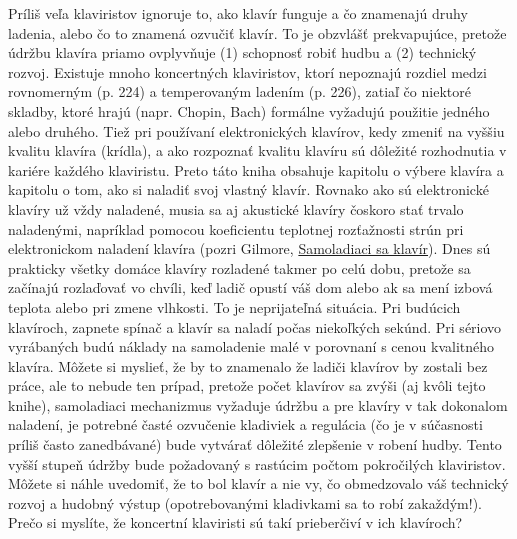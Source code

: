 Príliš veľa klaviristov ignoruje to, ako klavír funguje a čo znamenajú druhy ladenia, alebo čo to znamená ozvučiť klavír. To je obzvlášť prekvapujúce, pretože údržbu klavíra priamo ovplyvňuje (1) schopnosť robiť hudbu a (2) technický rozvoj. Existuje mnoho koncertných klaviristov, ktorí nepoznajú rozdiel medzi rovnomerným (p. 224) a temperovaným ladením (p. 226), zatiaľ čo niektoré skladby, ktoré hrajú (napr. Chopin, Bach) formálne vyžadujú použitie jedného alebo druhého. Tiež pri používaní elektronických klavírov, kedy zmeniť na vyššiu kvalitu klavíra (krídla), a ako rozpoznať kvalitu klavíru sú dôležité rozhodnutia v kariére každého klaviristu. Preto táto kniha obsahuje kapitolu o výbere klavíra a kapitolu o tom, ako si naladiť svoj vlastný klavír. Rovnako ako sú elektronické klavíry už vždy naladené, musia sa aj akustické klavíry čoskoro stať trvalo naladenými, napríklad pomocou koeficientu teplotnej  rozťažnosti strún pri elektronickom naladení klavíra (pozri Gilmore, \href{http://home.kc.rr.com/eromlignod}{Samoladiaci sa klavír}). Dnes sú prakticky všetky domáce klavíry rozladené takmer po celú dobu, pretože sa začínajú rozlaďovať vo chvíli, keď ladič opustí váš dom alebo ak sa mení izbová teplota alebo pri zmene vlhkosti. To je neprijateľná situácia. Pri budúcich klavíroch, zapnete spínač a klavír sa naladí počas niekoľkých sekúnd. Pri sériovo vyrábaných budú náklady na samoladenie malé v porovnaní s cenou kvalitného klavíra. Môžete si myslieť, že by to znamenalo že ladiči klavírov by zostali bez práce, ale to nebude ten prípad, pretože počet klavírov sa  zvýši (aj kvôli tejto knihe), samoladiaci mechanizmus vyžaduje údržbu a pre klavíry v tak dokonalom naladení, je potrebné časté ozvučenie kladiviek a regulácia (čo je v súčasnosti príliš často zanedbávané) bude vytvárať dôležité zlepšenie v robení hudby. Tento vyšší stupeň údržby bude požadovaný s rastúcim počtom pokročilých klaviristov. Môžete si náhle uvedomiť, že to bol klavír a nie vy, čo obmedzovalo váš technický rozvoj a hudobný výstup (opotrebovanými kladivkami sa to robí zakaždým!). Prečo si myslíte, že koncertní klaviristi sú takí prieberčiví v ich klavíroch?


